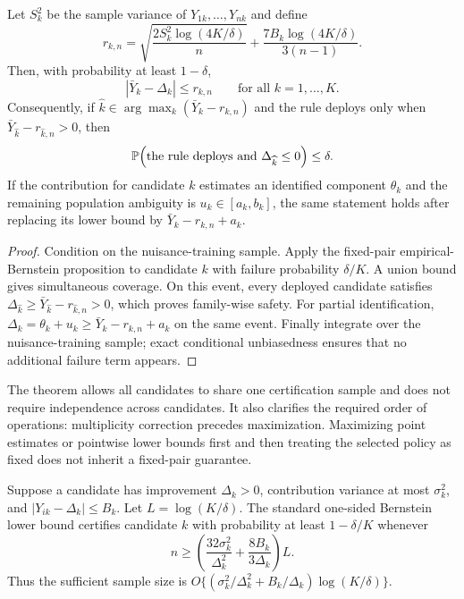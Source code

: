 \begin{theorem}
\label{thm:supplibrary}
Let $S_k^2$ be the sample variance of $Y_{1k},\ldots,Y_{nk}$ and define
\[
r_{k,n}=\sqrt{\frac{2S_k^2\log(4K/\delta)}{n}}
+\frac{7B_k\log(4K/\delta)}{3(n-1)}.
\]
Then, with probability at least $1-\delta$,
\[
|\bar Y_k-\Delta_k|\le r_{k,n}
\qquad\text{for all }k=1,\ldots,K.
\]
Consequently, if $\widehat k\in\arg\max_k(\bar Y_k-r_{k,n})$ and the rule deploys only when $\bar Y_{\widehat k}-r_{\widehat k,n}>0$, then
\[
\mathbb{P}\!\left(
\text{the rule deploys and }\Delta_{\widehat k}\le0
\right)\le\delta.
\]
If the contribution for candidate $k$ estimates an identified component $\theta_k$ and the remaining population ambiguity is $u_k\in[a_k,b_k]$, the same statement holds after replacing its lower bound by $\bar Y_k-r_{k,n}+a_k$.
\end{theorem}

\begin{proof}
Condition on the nuisance-training sample. Apply the fixed-pair empirical-Bernstein proposition to candidate $k$ with failure probability $\delta/K$. A union bound gives simultaneous coverage. On this event, every deployed candidate satisfies
$\Delta_{\widehat k}\ge \bar Y_{\widehat k}-r_{\widehat k,n}>0$,
which proves family-wise safety. For partial identification,
$\Delta_k=\theta_k+u_k\ge\bar Y_k-r_{k,n}+a_k$
on the same event. Finally integrate over the nuisance-training sample; exact conditional unbiasedness ensures that no additional failure term appears.
\end{proof}

The theorem allows all candidates to share one certification sample and does not require independence across candidates. It also clarifies the required order of operations: multiplicity correction precedes maximization. Maximizing point estimates or pointwise lower bounds first and then treating the selected policy as fixed does not inherit a fixed-pair guarantee.

\begin{proposition}
\label{prop:librarycomplexity}
Suppose a candidate has improvement $\Delta_k>0$, contribution variance at most $\sigma_k^2$, and $|Y_{ik}-\Delta_k|\le B_k$. Let $L=\log(K/\delta)$. The standard one-sided Bernstein lower bound certifies candidate $k$ with probability at least $1-\delta/K$ whenever
\[
n\ge
\left(
\frac{32\sigma_k^2}{\Delta_k^2}
+\frac{8B_k}{3\Delta_k}
\right)L.
\]
Thus the sufficient sample size is
$O\{(\sigma_k^2/\Delta_k^2+B_k/\Delta_k)\log(K/\delta)\}$.
\end{proposition}

